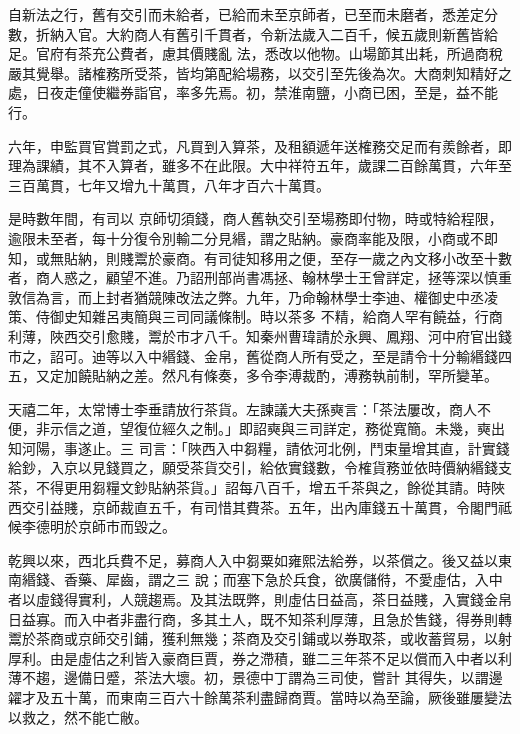 \begin{pinyinscope}
 自新法之行，舊有交引而未給者，已給而未至京師者，已至而未磨者，悉差定分數，折納入官。大約商人有舊引千貫者，令新法歲入二百千，候五歲則新舊皆給足。官府有茶充公費者，慮其價賤亂
 法，悉改以他物。山場節其出耗，所過商稅嚴其覺舉。諸榷務所受茶，皆均第配給場務，以交引至先後為次。大商刺知精好之處，日夜走僮使繼券詣官，率多先焉。初，禁淮南鹽，小商已困，至是，益不能行。



 六年，申監買官賞罰之式，凡買到入算茶，及租額遞年送榷務交足而有羨餘者，即理為課績，其不入算者，雖多不在此限。大中祥符五年，歲課二百餘萬貫，六年至三百萬貫，七年又增九十萬貫，八年才百六十萬貫。



 是時數年間，有司以
 京師切須錢，商人舊執交引至場務即付物，時或特給程限，逾限未至者，每十分復令別輸二分見緡，謂之貼納。豪商率能及限，小商或不即知，或無貼納，則賤鬻於豪商。有司徒知移用之便，至存一歲之內文移小改至十數者，商人惑之，顧望不進。乃詔刑部尚書馮拯、翰林學士王曾詳定，拯等深以慎重敦信為言，而上封者猶競陳改法之弊。九年，乃命翰林學士李迪、權御史中丞凌策、侍御史知雜呂夷簡與三司同議條制。時以茶多
 不精，給商人罕有饒益，行商利薄，陜西交引愈賤，鬻於市才八千。知秦州曹瑋請於永興、鳳翔、河中府官出錢市之，詔可。迪等以入中緡錢、金帛，舊從商人所有受之，至是請令十分輸緡錢四五，又定加饒貼納之差。然凡有條奏，多令李溥裁酌，溥務執前制，罕所變革。



 天禧二年，太常博士李垂請放行茶貨。左諫議大夫孫奭言：「茶法屢改，商人不便，非示信之道，望復位經久之制。」即詔奭與三司詳定，務從寬簡。未幾，奭出知河陽，事遂止。三
 司言：「陜西入中芻糧，請依河北例，鬥束量增其直，計實錢給鈔，入京以見錢買之，願受茶貨交引，給依實錢數，令榷貨務並依時價納緡錢支茶，不得更用芻糧文鈔貼納茶貨。」詔每八百千，增五千茶與之，餘從其請。時陜西交引益賤，京師裁直五千，有司惜其費茶。五年，出內庫錢五十萬貫，令閣門祗候李德明於京師市而毀之。



 乾興以來，西北兵費不足，募商人入中芻粟如雍熙法給券，以茶償之。後又益以東南緡錢、香藥、犀齒，謂之三
 說；而塞下急於兵食，欲廣儲偫，不愛虛估，入中者以虛錢得實利，人競趨焉。及其法既弊，則虛估日益高，茶日益賤，入實錢金帛日益寡。而入中者非盡行商，多其土人，既不知茶利厚薄，且急於售錢，得券則轉鬻於茶商或京師交引鋪，獲利無幾；茶商及交引鋪或以券取茶，或收蓄貿易，以射厚利。由是虛估之利皆入豪商巨賈，券之滯積，雖二三年茶不足以償而入中者以利薄不趨，邊備日蹙，茶法大壞。初，景德中丁謂為三司使，嘗計
 其得失，以謂邊糴才及五十萬，而東南三百六十餘萬茶利盡歸商賈。當時以為至論，厥後雖屢變法以救之，然不能亡敝。




\end{pinyinscope}
